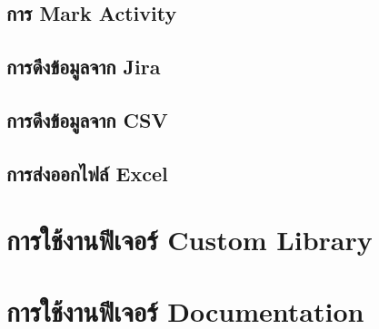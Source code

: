 \subsection{การ Mark Activity}
\subsection{การดึงข้อมูลจาก Jira}
\subsection{การดึงข้อมูลจาก CSV}
\subsection{การส่งออกไฟล์ Excel}

\section{การใช้งานฟีเจอร์ Custom Library}

\section{การใช้งานฟีเจอร์ Documentation}
